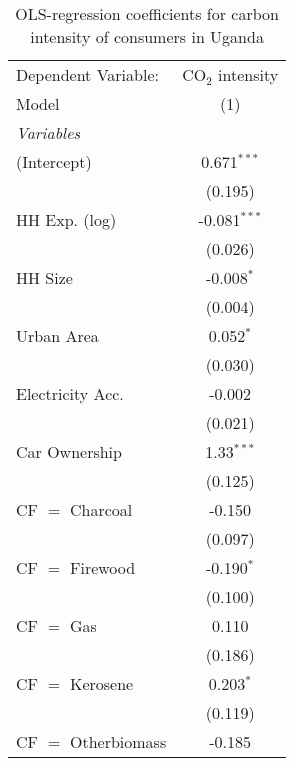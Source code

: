 
\begin{table}[htbp!]
   \centering
   \small
   \begin{adjustbox}{width = 1\textwidth, max height = 0.95\textheight, center}
      \begin{threeparttable}[b]
         \caption{\label{tab:OLS_1_UGA} OLS-regression coefficients for carbon intensity of consumers in Uganda}
         \begin{tabular}{lc}
            \tabularnewline \midrule \midrule
            Dependent Variable: & CO$_{2}$ intensity\\  
            Model               & (1)\\  
            \midrule
            \emph{Variables}\\
            (Intercept)         & 0.671$^{***}$\\   
                                & (0.195)\\   
            HH Exp. (log)       & -0.081$^{***}$\\   
                                & (0.026)\\   
            HH Size             & -0.008$^{*}$\\   
                                & (0.004)\\   
            Urban Area          & 0.052$^{*}$\\   
                                & (0.030)\\   
            Electricity Acc.    & -0.002\\   
                                & (0.021)\\   
            Car Ownership       & 1.33$^{***}$\\   
                                & (0.125)\\   
            CF $=$ Charcoal     & -0.150\\   
                                & (0.097)\\   
            CF $=$ Firewood     & -0.190$^{*}$\\   
                                & (0.100)\\   
            CF $=$ Gas          & 0.110\\   
                                & (0.186)\\   
            CF $=$ Kerosene     & 0.203$^{*}$\\   
                                & (0.119)\\   
            CF $=$ Otherbiomass & -0.185\\   

\end{tabular}
\end{threeparttable}
\end{adjustbox}
\end{table}

